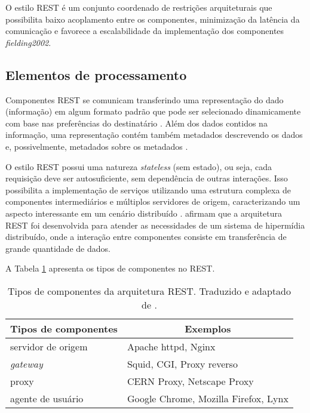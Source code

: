   O estilo REST é um conjunto coordenado de restrições arquiteturais que possibilita baixo acoplamento entre os componentes,
  minimização da latência da comunicação e favorece a escalabilidade da implementação dos componentes \textit{fielding2002}.
  
  \subsection{Elementos de processamento}
  
    Componentes REST se comunicam transferindo uma representação do dado (informação) em algum formato padrão que pode
    ser selecionado dinamicamente com base nas preferências do destinatário \cite{fielding2002}. Além dos dados contidos na 
    informação, uma representação contém também metadados descrevendo os dados e, possivelmente, metadados sobre os
    metadados \cite{fielding2002}.
    
    O estilo REST possui uma natureza \textit{stateless} (sem estado), ou seja, cada requisição deve ser autosuficiente, sem
    dependência de outras interações. Isso possibilita a implementação de serviços utilizando uma estrutura complexa de componentes
    intermediários e múltiplos servidores de origem, caracterizando um aspecto interessante em um cenário distribuído \cite{fielding2002}.
     afirmam que a arquitetura REST foi desenvolvida para atender as necessidades de um sistema de
    hipermídia distribuído, onde a interação entre componentes consiste em transferência de grande quantidade de dados.
    
    A Tabela \ref{rest-components-elements} apresenta os tipos de componentes no REST.
  
    \begin{table}[ht!]
    \centering
    \caption{Tipos de componentes da arquitetura REST. Traduzido e adaptado de \cite{fielding2002}.}
    \label{rest-components-elements}
    \begin{tabular}{l|l}
    \hline
    \multicolumn{1}{c|}{\textbf{Tipos de componentes}} & \multicolumn{1}{c}{\textbf{Exemplos}} \\ \hline
    servidor de origem                                  & Apache httpd, Nginx                    \\ \hline
    \textit{gateway}                                    & Squid, CGI, Proxy reverso              \\ \hline
    proxy                                               & CERN Proxy, Netscape Proxy             \\ \hline
    agente de usuário                                   & Google Chrome, Mozilla Firefox, Lynx   \\ \hline
    \end{tabular}
    \end{table}
  
